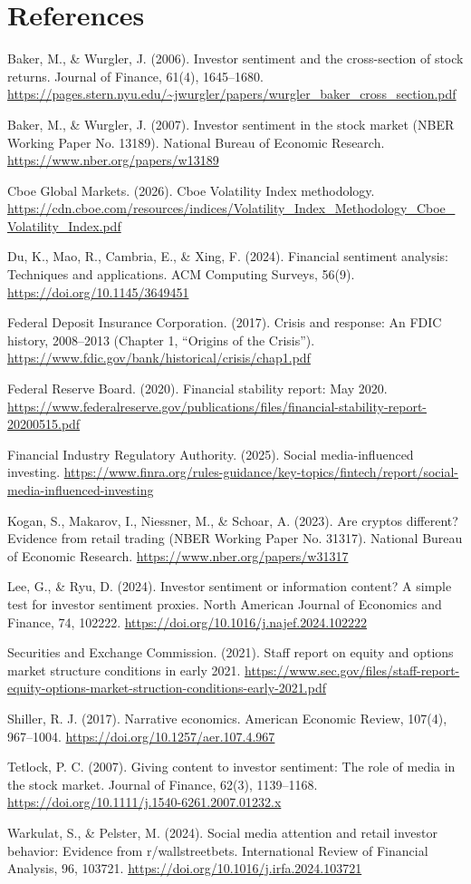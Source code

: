 \documentclass[12pt]{article}
\begin{document}
\section*{References}

Baker, M., \& Wurgler, J. (2006). Investor sentiment and the cross-section of stock returns. Journal of Finance, 61(4), 1645--1680. \url{https://pages.stern.nyu.edu/~jwurgler/papers/wurgler_baker_cross_section.pdf}

Baker, M., \& Wurgler, J. (2007). Investor sentiment in the stock market (NBER Working Paper No. 13189). National Bureau of Economic Research. \url{https://www.nber.org/papers/w13189}

Cboe Global Markets. (2026). Cboe Volatility Index methodology. \url{https://cdn.cboe.com/resources/indices/Volatility_Index_Methodology_Cboe_Volatility_Index.pdf}

Du, K., Mao, R., Cambria, E., \& Xing, F. (2024). Financial sentiment analysis: Techniques and applications. ACM Computing Surveys, 56(9). \url{https://doi.org/10.1145/3649451}

Federal Deposit Insurance Corporation. (2017). Crisis and response: An FDIC history, 2008--2013 (Chapter 1, ``Origins of the Crisis''). \url{https://www.fdic.gov/bank/historical/crisis/chap1.pdf}

Federal Reserve Board. (2020). Financial stability report: May 2020. \url{https://www.federalreserve.gov/publications/files/financial-stability-report-20200515.pdf}

Financial Industry Regulatory Authority. (2025). Social media-influenced investing. \url{https://www.finra.org/rules-guidance/key-topics/fintech/report/social-media-influenced-investing}

Kogan, S., Makarov, I., Niessner, M., \& Schoar, A. (2023). Are cryptos different? Evidence from retail trading (NBER Working Paper No. 31317). National Bureau of Economic Research. \url{https://www.nber.org/papers/w31317}

Lee, G., \& Ryu, D. (2024). Investor sentiment or information content? A simple test for investor sentiment proxies. North American Journal of Economics and Finance, 74, 102222. \url{https://doi.org/10.1016/j.najef.2024.102222}

Securities and Exchange Commission. (2021). Staff report on equity and options market structure conditions in early 2021. \url{https://www.sec.gov/files/staff-report-equity-options-market-struction-conditions-early-2021.pdf}

Shiller, R. J. (2017). Narrative economics. American Economic Review, 107(4), 967--1004. \url{https://doi.org/10.1257/aer.107.4.967}

Tetlock, P. C. (2007). Giving content to investor sentiment: The role of media in the stock market. Journal of Finance, 62(3), 1139--1168. \url{https://doi.org/10.1111/j.1540-6261.2007.01232.x}

Warkulat, S., \& Pelster, M. (2024). Social media attention and retail investor behavior: Evidence from r/wallstreetbets. International Review of Financial Analysis, 96, 103721. \url{https://doi.org/10.1016/j.irfa.2024.103721}
\end{document}
